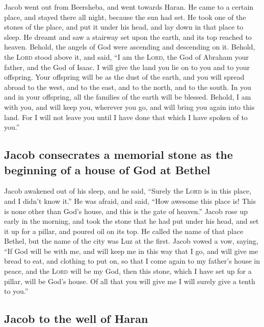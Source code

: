  Jacob went out from Beersheba, and went towards Haran.
 He came to a certain place, and stayed there all night,
because the sun had set. He took one of the stones of the place, and put
it under his head, and lay down in that place to sleep. 
He dreamt and saw a stairway set upon the earth, and its top reached to
heaven. Behold, the angels of God were ascending and descending on it.
 Behold, the \textsc{Lord} stood above it, and said, ``I
am the \textsc{Lord}, the God of Abraham your father, and the God of
Isaac. I will give the land you lie on to you and to your offspring.
 Your offspring will be as the dust of the earth, and you
will spread abroad to the west, and to the east, and to the north, and
to the south. In you and in your offspring, all the families of the
earth will be blessed.  Behold, I am with you, and will
keep you, wherever you go, and will bring you again into this land. For
I will not leave you until I have done that which I have spoken of to
you.''

\hypertarget{jacob-consecrates-a-memorial-stone-as-the-beginning-of-a-house-of-god-at-bethel}{%
\subsection{Jacob consecrates a memorial stone as the beginning of a
house of God at
Bethel}\label{jacob-consecrates-a-memorial-stone-as-the-beginning-of-a-house-of-god-at-bethel}}

 Jacob awakened out of his sleep, and he said, ``Surely
the \textsc{Lord} is in this place, and I didn't know it.''
 He was afraid, and said, ``How awesome this place is!
This is none other than God's house, and this is the gate of heaven.''
 Jacob rose up early in the morning, and took the stone
that he had put under his head, and set it up for a pillar, and poured
oil on its top.  He called the name of that place Bethel,
but the name of the city was Luz at the first.  Jacob
vowed a vow, saying, ``If God will be with me, and will keep me in this
way that I go, and will give me bread to eat, and clothing to put on,
 so that I come again to my father's house in peace, and
the \textsc{Lord} will be my God,  then this stone, which
I have set up for a pillar, will be God's house. Of all that you will
give me I will surely give a tenth to you.''

\hypertarget{jacob-to-the-well-of-haran}{%
\subsection{Jacob to the well of
Haran}\label{jacob-to-the-well-of-haran}}

